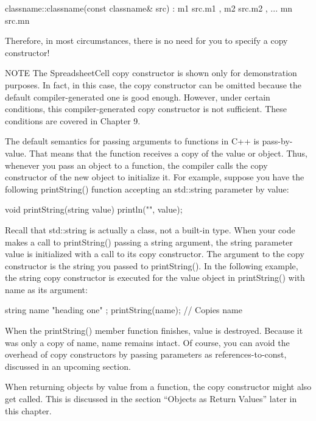 \begin{cpp}
classname::classname(const classname& src)
: m1 { src.m1 }, m2 { src.m2 }, ... mn { src.mn } { }
\end{cpp}

Therefore, in most circumstances, there is no need for you to specify a copy constructor!

\begin{myNotic}{NOTE}
The SpreadsheetCell copy constructor is shown only for demonstration purposes. In fact, in this case, the copy constructor can be omitted because the default compiler-generated one is good enough. However, under certain conditions, this compiler-generated copy constructor is not sufficient. These conditions are covered in Chapter 9.
\end{myNotic}


The default semantics for passing arguments to functions in C++ is pass-by-value. That means that the function receives a copy of the value or object. Thus, whenever you pass an object to a function, the compiler calls the copy constructor of the new object to initialize it. For example, suppose you have the following printString() function accepting an std::string parameter by value:

\begin{cpp}
void printString(string value)
{
    println("{}", value);
}
\end{cpp}

Recall that std::string is actually a class, not a built-in type. When your code makes a call to printString() passing a string argument, the string parameter value is initialized with a call to its copy constructor. The argument to the copy constructor is the string you passed to printString(). In the following example, the string copy constructor is executed for the value object in printString() with name as its argument:

\begin{cpp}
string name { "heading one" };
printString(name); // Copies name
\end{cpp}

When the printString() member function finishes, value is destroyed. Because it was only a copy of name, name remains intact. Of course, you can avoid the overhead of copy constructors by passing parameters as references-to-const, discussed in an upcoming section.

When returning objects by value from a function, the copy constructor might also get called. This is discussed in the section “Objects as Return Values” later in this chapter.

